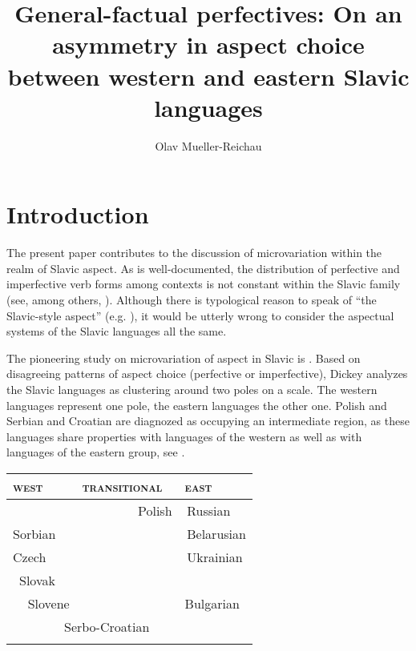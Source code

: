 \documentclass[output=paper,
modfonts,
newtxmath,
hidelinks
]{langscibook}
\title{General-factual perfectives: On an asymmetry in aspect choice between western and eastern Slavic languages}
\author{%
 Olav Mueller-Reichau\affiliation{University of Leipzig}
}
\begin{document}
\maketitle
{}

\section{Introduction}\label{s1} 

The present paper contributes to the discussion of microvariation within the realm of Slavic aspect. 
As is well-documented, the distribution 
of perfective and imperfective verb forms among contexts is not constant within the Slavic family (see, among others, \citealt{Stunova1991,Stunova1993,Breu2000,Petruchina2000,Dickey2000,Dickey15,Dickey18,Gehrke02,Wiemer08,Rivero10,Alvestad13,Gattnar13,Berger13,Rivero14,Duebbers15,FK15,FK18}).
Although there is typological reason to speak of ``the Slavic-style aspect'' (e.g. \citealt{Dahl85,Plungjan11}),
it would be utterly wrong to consider the aspectual systems of the Slavic languages all the same. 

The pioneering study on microvariation of aspect in Slavic is \citet{Dickey2000}. Based on disagreeing patterns of aspect choice (perfective or imperfective),
Dickey analyzes the Slavic languages as clustering around two poles on a scale. The western languages represent one pole, the eastern languages the other one. 
Polish and Serbian and Croatian are diagnozed as occupying an intermediate region, as these languages share properties with languages of the western as well as with 
languages of the eastern group, see .




\begin{table}
\centering
      \label{sd1}
      \begin{tabularx}{0.6\textwidth}{l l l}
\lsptoprule \textsc{west} & \textsc{transitional} & \textsc{east}\\
\midrule     &  $\quad\quad\quad\quad$ Polish & $\,$Russian \\
   Sorbian  &    & $\,$Belarusian \\
    Czech  &    &  $\,$Ukrainian\\ 
  $\,$  Slovak  &    &  \\
   $\,\,\,\,\,$  Slovene  &    & Bulgarian \\
        \multicolumn{2}{l}{$\quad\quad\quad\quad$Serbo-Croatian} & \\
\lspbottomrule
\end{tabularx}
\end{table}
\end{document}

